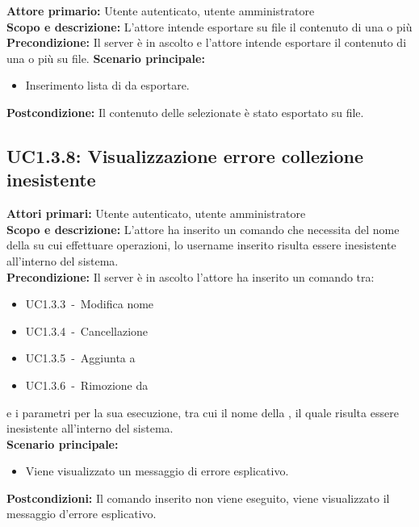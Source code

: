\documentclass{scalatekids-article}
\begin{document}
\textbf{Attore primario:} Utente autenticato, utente amministratore\\
\textbf{Scopo e descrizione:} L'attore intende esportare su file il contenuto di una o più \\
\textbf{Precondizione:} Il server è in ascolto e l'attore intende esportare il contenuto di una o più  su file.
\textbf{Scenario principale:}
\begin{itemize}
\item Inserimento lista di  da esportare.
\end{itemize}
\textbf{Postcondizione:} Il contenuto delle  selezionate è stato esportato su file.

\subsection{UC1.3.8: Visualizzazione errore collezione inesistente}

\textbf{Attori primari:} Utente autenticato, utente amministratore\\
\textbf{Scopo e descrizione:} L'attore ha inserito un comando che necessita del nome della  su cui effettuare operazioni, lo username inserito risulta essere inesistente all'interno del sistema.\\
\textbf{Precondizione:}
Il server è in ascolto l'attore ha inserito un comando tra:
\begin{itemize}
\item UC1.3.3\ -\ Modifica nome 
\item UC1.3.4\ -\ Cancellazione 
\item UC1.3.5\ -\ Aggiunta  a 
\item UC1.3.6\ -\ Rimozione  da 
\end{itemize}
e i parametri per la sua esecuzione, tra cui il nome della , il quale risulta essere inesistente all'interno del sistema.\\
\textbf{Scenario principale:}
\begin{itemize}
\item Viene visualizzato un messaggio di errore esplicativo.
\end{itemize}
\textbf{Postcondizioni:} Il comando inserito non viene eseguito, viene visualizzato il messaggio d'errore esplicativo.
\end{document}

